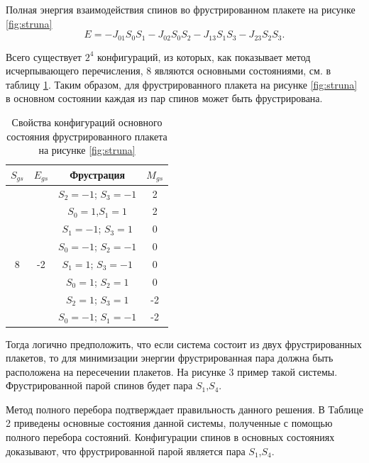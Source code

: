 \documentclass[utf8, babel, sor, jor, amsmath, amssymb, reprint]{elsarticle} %
\begin{document}
Полная энергия взаимодействия спинов во фрустрированном плакете на рисунке \ref{fig:struna}
\begin{equation}
	E = -J_{01} S_0 S_1-J_{02} S_0 S_2-J_{13} S_1 S_3-J_{23} S_2 S_3.
	\label{eq:ising_energy_2x2}
\end{equation}

Всего существует $2^4$ конфигураций, из которых, как показывает метод исчерпывающего перечисления, 8 являются основными состояниями, см. в таблицу \ref{tab:Strunags}. Таким образом, для фрустрированного плакета на рисунке \ref{fig:struna} в основном состоянии каждая из пар спинов может быть фрустрирована.

\begin{table}[H]
		\centering
	\begin{tabular}{|c|c|c|c|}
	
		\hline
	 $S_{gs}$	& $E_{gs}$    & Фрустрация  &   $M_{gs}$   \\
	\hline
	    & & 	$S_2=-1$; $S_3=-1$ & 2   \\ 	\cline{3-4}
	   	& & $S_0=1$,$S_1=1$        & 2\\ 	\cline{3-4}
		& &  $S_1=-1$; $S_3=1$     & 0    \\ \cline{3-4} 
        &  & $S_0=-1$; $S_2=-1$ &	0  \\ 
		\cline{3-4} 
		8	\multirow{3}{*}{} & -2 \multirow{3}{*}{} & $S_1=1$;  $S_3=-1$     &  0\\ \cline{3-4}	
		& & $S_0=1$;  $S_2=1$      &  0\\ \cline{3-4}
		& &	$S_2=1$;  $S_3=1$      &  -2\\ \cline{3-4}
		& &	$S_0=-1$; $S_1=-1$     & -2\\ \hline
	
	\end{tabular}
	\caption{Свойства конфигураций основного состояния фрустрированного плакета на рисунке \ref{fig:struna}}
	\label{tab:Strunags}
\end{table}
  
Тогда логично предположить, что если система состоит из двух фрустрированных плакетов, то для минимизации энергии фрустрированная пара должна быть расположена на пересечении плакетов. На рисунке 3 пример такой системы. Фрустрированной парой спинов будет пара $S_1$,$S_4$.

Метод полного перебора подтверждает правильность данного решения. В Таблице 2 приведены основные состояния данной системы, полученные с помощью полного перебора состояний. Конфигурации спинов в основных состояниях доказывают, что фрустрированной парой является пара $S_1$,$S_4$. 
\end{document}
